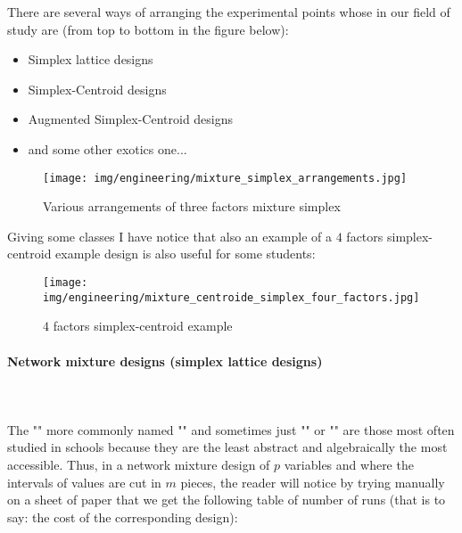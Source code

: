 	There are several ways of arranging the experimental points whose in our field of study are (from top to bottom in the figure below):
	\begin{itemize}
		\item Simplex lattice designs
		\item Simplex-Centroid designs
		\item Augmented Simplex-Centroid designs
		\item and some other exotics one...
	\end{itemize}
	\begin{figure}[H]
		\centering
		\texttt{[image: img/engineering/mixture\_simplex\_arrangements.jpg]}	
		\caption{Various arrangements of three factors mixture simplex}
	\end{figure}
	Giving some classes I have notice that also an example of a $4$ factors simplex-centroid example design is also useful for some students:
	\begin{figure}[H]
		\centering
		\texttt{[image: img/engineering/mixture\_centroide\_simplex\_four\_factors.jpg]}	
		\caption{$4$ factors simplex-centroid example}
	\end{figure}
	
	\paragraph{Network mixture designs (simplex lattice designs)}\mbox{}\\\\
	The "" more commonly named "" and sometimes just "" or "" are those most often studied in schools because they are the least abstract and algebraically the most accessible. Thus, in a network mixture design of $p$ variables and where the intervals of values are cut in $m$ pieces, the reader will notice by trying manually on a sheet of paper that we get the following table of number of runs (that is to say: the cost of the corresponding design):
	
